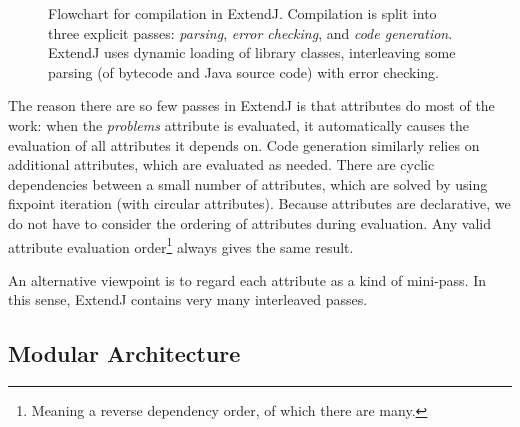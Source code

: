 \documentclass[10pt, twoside, openright]{book}
\newcommand*\cleartoleftpage{%
  \clearpage
  \ifodd\value{page}\hbox{}\newpage\fi
}
\begin{document}
\begin{figure}
  \centering
{}
\caption{Flowchart for compilation in ExtendJ. Compilation is split into three
explicit passes: \emph{parsing}, \emph{error checking}, and \emph{code
generation}. ExtendJ uses dynamic loading of library classes, interleaving some
parsing (of bytecode and Java source code) with error checking.}
\label{fig:exj-passes}
\end{figure}

The reason there are so few passes in ExtendJ is that attributes do most of the work:
when the \emph{problems} attribute is evaluated, it automatically causes the evaluation of
all attributes it depends on. Code generation similarly relies on additional attributes, which are
evaluated as needed.
There are cyclic dependencies between a small number of
attributes, which are solved by using fixpoint iteration (with circular attributes).
Because attributes are declarative, we do not have to consider the ordering of attributes during
evaluation. Any valid attribute evaluation order\footnote{%
Meaning a reverse dependency order, of which there are many.}
always gives the same result.

An alternative viewpoint is to regard each attribute as a kind of mini-pass. In this sense,
ExtendJ contains very many interleaved passes.

\cleartoleftpage
\subsection{Modular Architecture}
\end{document}

